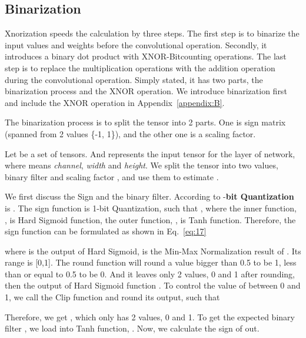 \documentclass[sn-mathphys,iicol,Numbered]{sn-jnl}
\begin{document}
\begin{appendices}

\section{Binarization} \label{appendix:A}

Xnorization speeds the calculation by three steps. The first step is to binarize the input values and weights before the convolutional operation. Secondly, it introduces a binary dot product with XNOR-Bitcounting operations. The last step is to replace the multiplication operations with the addition operation during the convolutional operation. Simply stated, it has two parts, the binarization process and the XNOR operation. We introduce binarization first and include the XNOR operation in Appendix~\ref{appendix:B}.

The binarization process is to split the tensor into 2 parts. One is sign matrix (spanned from 2 values \{-1, 1\}), and the other one is a scaling factor. 

Let  be a set of tensors. And  represents the input tensor for the  layer of network, where  means \textit{channel}, \textit{width} and \textit{height}. We split the tensor  into two values, binary filter  and scaling factor , and use them to estimate . 

We first discuss the Sign and the binary filter. According to \citep{A2_xnor} -\textbf{bit Quantization} is . The sign function is 1-bit Quantization, such that , where the inner function, , is Hard Sigmoid function, the outer function, , is Tanh function. Therefore, the sign function can be formulated as shown in Eq.~\ref{eq:17}
\vspace{-0.2cm}

where  is the output of Hard Sigmoid,  is the Min-Max Normalization result of . Its range is [0,1]. The round function will round a value bigger than 0.5 to be 1, less than or equal to 0.5 to be 0. And it leaves  only 2 values, 0 and 1 after rounding, then the output of Hard Sigmoid function . To control the value of  between 0 and 1, we call the Clip function and round its output, such that
\vspace{-0.2cm}

\vspace{-0.3cm}

Therefore, we get , which only has 2 values, 0 and 1. To get the expected binary filter , we load  into Tanh function, . Now, we calculate the sign of  out.


\end{appendices}
\end{document}

